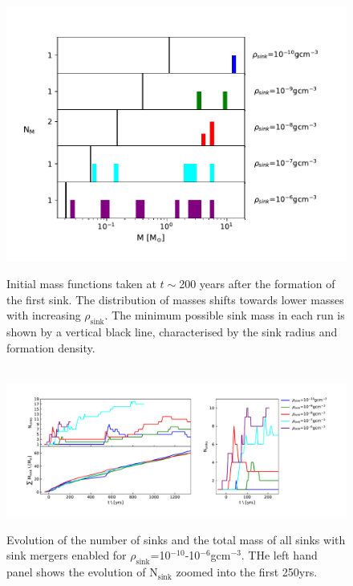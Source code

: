 \documentclass[fleqn,usenatbib]{mnras}
\begin{document}
\begin{figure}
	 \hbox{\hspace{-1cm} \includegraphics[scale=0.6]{IMF.pdf}}
    \caption{Initial mass functions taken at $t\sim$200 years after the formation of the first sink. The distribution of masses shifts towards lower masses with increasing $\rho_{\text{sink}}$. The minimum possible sink mass in each run is shown by a vertical black line, characterised by the sink radius and formation density. }
    \label{fig:IMF}
\end{figure}

\begin{figure}
	\hbox{\hspace{0cm} \includegraphics[scale=0.6]{sinks.pdf}}
    \caption{Evolution of the number of sinks and the total mass of all sinks with sink mergers enabled for $\rho_{\text{sink}}$=10$^{-10}$-10$^{-6}$gcm$^{-3}$. THe left hand panel shows the evolution of N$_{\text{sink}}$ zoomed into the first 250yrs.}
    \label{fig:sinks}
\end{figure}
\end{document}
